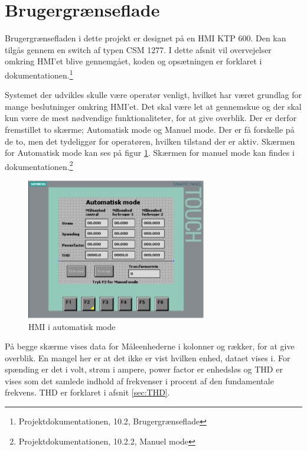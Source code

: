 

\section{Brugergrænseflade}

Brugergrænsefladen i dette projekt er designet på en HMI KTP 600. Den kan tilgås gennem en switch af typen CSM 1277. I dette afsnit vil overvejelser omkring HMI'et blive gennemgået, koden og opsætningen er forklaret i dokumentationen.\footnote{Projektdokumentationen, 10.2, Brugergrænseflade}


Systemet der udvikles skulle være operatør venligt, hvilket har været grundlag for mange beslutninger omkring HMI'et. Det skal være let at gennemskue og der skal kun være de mest nødvendige funktionaliteter, for at give overblik.
Der er derfor fremstillet to skærme; Automatisk mode og Manuel mode. Der er få forskelle på de to, men det tydeliggør for operatøren, hvilken tilstand der er aktiv. Skærmen for Automatisk mode kan ses på figur \ref{fig:HMIAutomatiskModeDesign}. Skærmen for manuel mode kan findes i dokumentationen.\footnote{Projektdokumentationen, 10.2.2, Manuel mode}

\begin{figure}[H] %
	\centering
	\includegraphics[width=0.7\textwidth]{Figure/HMIAutomatiskModeDesign}
	\caption{HMI i automatisk mode}
	\label{fig:HMIAutomatiskModeDesign}
\end{figure}

På begge skærme vises data for Måleenhederne i kolonner og rækker, for at give overblik. En mangel her er at det ikke er vist hvilken enhed, dataet vises i. For spænding er det i volt, strøm i ampere, power factor er enhedsløs og THD er vises som det samlede indhold af frekvenser i procent af den fundamentale frekvens. THD er forklaret i afsnit \ref{sec:THD}.



